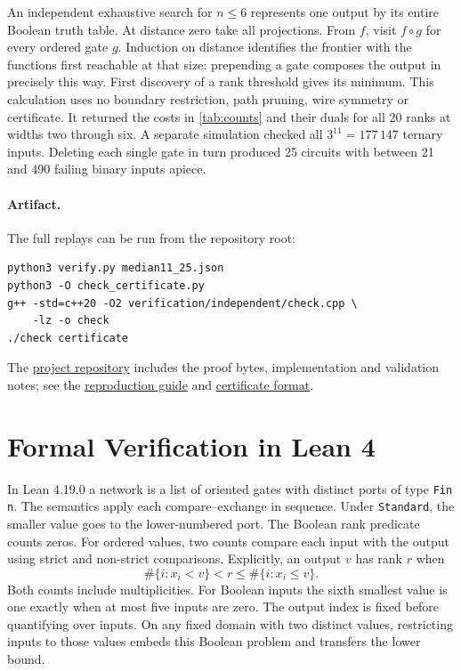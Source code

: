 An independent exhaustive search for $n\le6$ represents one output by
its entire Boolean truth table. At distance zero take all projections.
From $f$, visit $f\circ g$ for every ordered gate $g$. Induction on distance
identifies the frontier with the functions first reachable at that size:
prepending a gate composes the output in precisely this way. First discovery
of a rank threshold gives its minimum. This calculation uses no boundary
restriction, path pruning, wire symmetry or certificate. It returned the
costs in \cref{tab:counts} and their duals for all 20 ranks at widths two
through six. A separate simulation checked all $3^{11}=177\,147$ ternary
inputs. Deleting each single gate in turn produced 25 circuits with between
21 and 490 failing binary inputs apiece.

\paragraph{Artifact.}
The full replays can be run from the repository root:
\begin{verbatim}
python3 verify.py median11_25.json
python3 -O check_certificate.py
g++ -std=c++20 -O2 verification/independent/check.cpp \
    -lz -o check
./check certificate
\end{verbatim}
The \href{https://github.com/HaxelThePenguine/median-of-11}{project repository}
includes the proof bytes, implementation and validation notes;
see the \href{https://github.com/HaxelThePenguine/median-of-11/blob/main/docs/reproducibility.md}{reproduction guide}
and \href{https://github.com/HaxelThePenguine/median-of-11/blob/main/docs/certificate-format.md}{certificate format}.

\section{Formal Verification in Lean 4}\label{sec:lean}
In Lean 4.19.0 a network is a list of oriented gates with distinct
ports of type \texttt{Fin n}. The semantics apply each compare--exchange
in sequence. Under \texttt{Standard}, the smaller value goes to the
lower-numbered port. The Boolean rank predicate counts zeros. For
ordered values, two counts compare each input with the output using
strict and non-strict comparisons. Explicitly, an output $v$ has rank $r$
when
\[
  \#\{i:x_i<v\}<r\leq\#\{i:x_i\leq v\}.
\]
Both counts include multiplicities. For Boolean inputs the sixth
smallest value is one exactly when at most five inputs are zero.
The output index is fixed before quantifying over inputs. On any fixed
domain with two distinct values, restricting inputs to those values
embeds this Boolean problem and transfers the lower bound.

